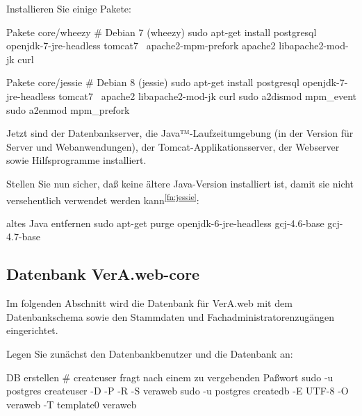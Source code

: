 \begin{minipage}{\textwidth}
Installieren Sie einige Pakete:

\begin{lstdump}{Pakete core/wheezy}
# Debian 7 (wheezy)
sudo apt-get install postgresql openjdk-7-jre-headless tomcat7 \
    apache2-mpm-prefork apache2 libapache2-mod-jk curl
\end{lstdump}

\begin{lstdump}{Pakete core/jessie}
# Debian 8 (jessie)
sudo apt-get install postgresql openjdk-7-jre-headless tomcat7 \
    apache2 libapache2-mod-jk curl
sudo a2dismod mpm_event
sudo a2enmod mpm_prefork
\end{lstdump}
\end{minipage}

Jetzt sind der Datenbankserver, die Java™-Laufzeitumgebung (in der
Version für Server und Webanwendungen), der Tomcat-Applikationsserver,
der Webserver sowie Hilfsprogramme installiert.

\begin{minipage}{\textwidth}
Stellen Sie nun sicher, daß keine ältere Java-Version installiert
ist, damit sie nicht versehentlich verwendet werden kann\Hair\textsuperscript{\ref{fn:jessie}}:

\begin{lstdump}{altes Java entfernen}
sudo apt-get purge openjdk-6-jre-headless gcj-4.6-base gcj-4.7-base
\end{lstdump}
\end{minipage}

\subsection{Datenbank VerA.web-core}\label{subsec:setup-core-db}

Im folgenden Abschnitt wird die Datenbank für VerA.web mit dem
Datenbankschema sowie den Stammdaten und Fachadministratorenzugängen
eingerichtet.

\begin{minipage}{\textwidth}
Legen Sie zunächst den Datenbankbenutzer und die Datenbank an:

\begin{lstdump}{DB erstellen}
# createuser fragt nach einem zu vergebenden Paßwort
sudo -u postgres createuser -D -P -R -S veraweb
sudo -u postgres createdb -E UTF-8 -O veraweb -T template0 veraweb
\end{lstdump}
\end{minipage}

